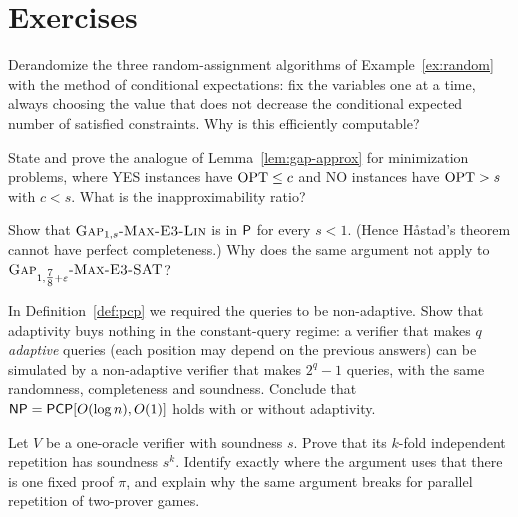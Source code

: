\section*{Exercises}

\begin{exercise}[\stars{$\star$}]\label{ex:derand}
Derandomize the three random-assignment algorithms of Example~\ref{ex:random} with the method of
conditional expectations: fix the variables one at a time, always choosing the value that does not
decrease the conditional expected number of satisfied constraints.  Why is this efficiently computable?
\end{exercise}

\begin{exercise}[\stars{$\star$}]\label{ex:minimization}
State and prove the analogue of Lemma~\ref{lem:gap-approx} for minimization problems, where YES
instances have $\operatorname{OPT}\le c$ and NO instances have $\operatorname{OPT}>s$ with $c<s$.  What is the
inapproximability ratio?
\end{exercise}

\begin{exercise}[\stars{$\star$}]\label{ex:gauss}
Show that $\textsc{Gap}_{1,s}\text{-}\textsc{Max-E3-Lin}$ is in $\mathsf{P}$ for every $s<1$.  (Hence H\aa stad's theorem
cannot have perfect completeness.)  Why does the same argument not apply to $\textsc{Gap}_{1,\tfrac78+\varepsilon}\text{-}\textsc{Max-E3-SAT}$?
\end{exercise}

\begin{exercise}[\stars{$\star\star$}]\label{ex:adaptive}
In Definition~\ref{def:pcp} we required the queries to be non-adaptive.  Show that adaptivity buys nothing in the constant-query regime: a verifier that makes $q$ \emph{adaptive}
queries (each position may depend on the previous answers) can be simulated by a non-adaptive verifier that makes $2^q-1$ queries, with the same randomness, completeness and soundness.
Conclude that $\mathsf{NP}=\mathsf{PCP}[O(\log n),O(1)]$ holds with or without adaptivity.
\end{exercise}

\begin{exercise}[\stars{$\star$}]\label{ex:repeat}
Let $V$ be a one-oracle verifier with soundness $s$.  Prove that its $k$-fold independent repetition has soundness $s^k$.
Identify exactly where the argument uses that there is one fixed proof $\pi$, and explain why the same
argument breaks for parallel repetition of two-prover games.
\end{exercise}

